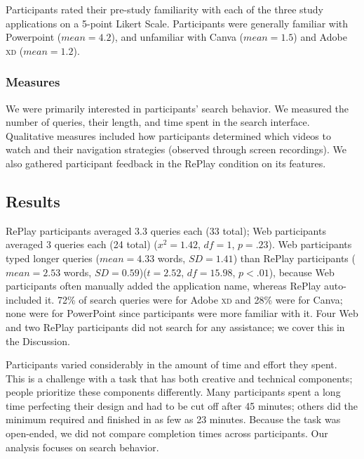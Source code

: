 Participants rated their pre-study familiarity with each of the three study applications on a 5-point Likert Scale. Participants were generally familiar with Powerpoint ($mean\!=\!4.2$), and unfamiliar with Canva ($mean\!=\!1.5$) and Adobe \textsc{xd} ($mean\!=\!1.2$).
 
\subsubsection{Measures}
We were primarily interested in participants' search behavior. We measured the number of queries, their length, and time spent in the search interface. Qualitative measures included how participants determined which videos to watch and their navigation strategies (observed through screen recordings). We also gathered participant feedback in the RePlay condition on its features.

\subsection{Results}
RePlay participants averaged 3.3 queries each (33 total); Web participants averaged 3 queries each (24 total) ($x^2\!=\!1.42$, $df\!=\!1$, $p\!=\!.23$). Web participants typed longer queries ($mean\!=\!4.33$ words, $SD\!=\!1.41$) than RePlay participants ($mean\!=\!2.53$ words, $SD\!=\!0.59$)($t\!=\!2.52$, $df\!=\!15.98$, $p\!<\!.01$), because Web participants often manually added the application name, whereas RePlay auto-included it. 72\% of search queries were for Adobe \textsc{xd} and 28\% were for Canva; none were for PowerPoint since participants were more familiar with it. Four Web and two RePlay participants did not search for any assistance; we cover this in the Discussion.

Participants varied considerably in the amount of time and effort they spent. This is a challenge with a task that has both creative and technical components; people prioritize these components differently. Many participants spent a long time perfecting their design and had to be cut off after 45 minutes; others did the minimum required and finished in as few as 23 minutes. Because the task was open-ended, we did not compare completion times across participants. Our analysis focuses on search behavior. 

